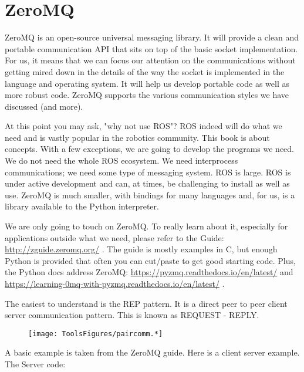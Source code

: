 \hypertarget{zeromq}{%
\section{ZeroMQ}\label{zeromq}}

ZeroMQ is an open-source universal messaging library. It will provide a
clean and portable communication API that sits on top of the basic
socket implementation. For us, it means that we can focus our attention
on the communications without getting mired down in the details of the
way the socket is implemented in the language and operating system. It
will help us develop portable code as well as more robust code. ZeroMQ
supports the various communication styles we have discussed (and more).

At this point you may ask, "why not use ROS"? ROS indeed will do what we
need and is vastly popular in the robotics community. This book is about
concepts. With a few exceptions, we are going to develop the programs we
need. We do not need the whole ROS ecosystem. We need interprocess
communications; we need some type of messaging system. ROS is large. ROS
is under active development and can, at times, be challenging to install
as well as use. ZeroMQ is much smaller, with bindings for many languages
and, for us, is a library available to the Python interpreter.

We are only going to touch on ZeroMQ. To really learn about it,
especially for applications outside what we need, please refer to the
Guide: \url{http://zguide.zeromq.org/} . The guide is mostly examples in
C, but enough Python is provided that often you can cut/paste to get
good starting code. Plus, the Python docs address ZeroMQ:
\url{https://pyzmq.readthedocs.io/en/latest/} and
\url{https://learning-0mq-with-pyzmq.readthedocs.io/en/latest/} .

The easiest to understand is the REP pattern. It is a direct peer to
peer client server communication pattern. This is known as REQUEST -
REPLY.

\begin{figure}
\centering
\texttt{[image: ToolsFigures/paircomm.*]}
\caption{}
\end{figure}

A basic example is taken from the ZeroMQ guide. Here is a client server
example. The Server code:

